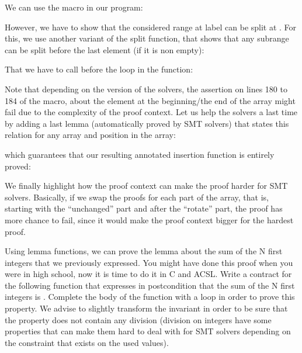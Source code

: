 We can use the macro in our program:




However, we have to show that the considered range at label  can
be split at . For this, we use another variant of the split
function, that shows that any subrange can be split before the last element (if
it is non empty):






That we have to call before the loop in the  function:




Note that depending on the version of the solvers, the assertion on lines 180 to
184 of the macro, about the element at the beginning/the end of the array might
fail due to the complexity of the proof context. Let us help the solvers a last
time by adding a last lemma (automatically proved by SMT solvers) that states
this relation for any array and position in the array:





which guarantees that our resulting annotated insertion function is entirely
proved:




We finally highlight how the proof context can make the proof harder for SMT
solvers. Basically, if we swap the proofs for each part of the array, that is,
starting with the ``unchanged'' part and after the ``rotate'' part, the proof has
more chance to fail, since it would make the proof context bigger for the
hardest proof.






Using lemma functions, we can prove the lemma about the sum of the N first
integers that we previously expressed. You might have done this proof when you
were in high school, now it is time to do it in C and ACSL. Write a contract for
the following function that expresses in postcondition that the sum of the N
first integers is . Complete the body of the function with
a loop in order to prove this property. We advise to slightly transform the
invariant in order to be sure that the property does not contain any division
(division on integers have some properties that can make them hard to deal with
for SMT solvers depending on the constraint that exists on the used values).


